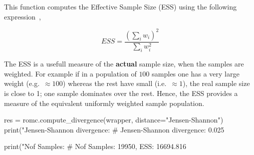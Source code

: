 \noindent
This function computes the Effective Sample Size (ESS) using the
following expression~\autocite{Sudman1967},

\begin{equation} \label{eq:ESS}
  ESS = \frac{(\sum_i w_i)^2}{\sum_i w_i^2}
\end{equation}

The ESS is a usefull measure of the \textbf{actual} sample size, when
the samples are weighted. For example if in a population of $100$
samples one has a very large weight (e.g.\ $\approx 100$) whereas the
rest have small (i.e.\ $\approx 1$), the real sample size is close to
1; one sample dominates over the rest. Hence, the ESS provides a
measure of the equivalent uniformly weighted sample population.

\newpage


\begin{pythoncode}
res = romc.compute_divergence(wrapper, distance="Jensen-Shannon")                                 
print("Jensen-Shannon divergence: %
# Jensen-Shannon divergence: 0.025

print("Nof Samples: %
# Nof Samples: 19950, ESS: 16694.816
\end{pythoncode}
